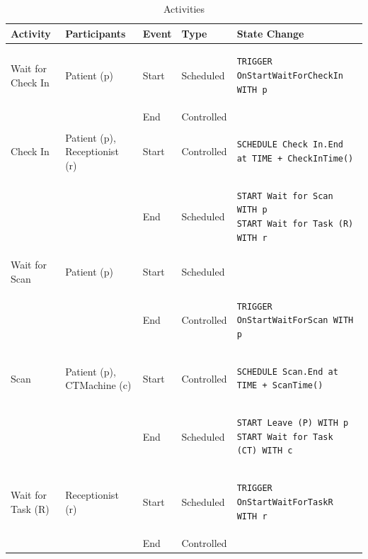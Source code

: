 \documentclass[
  10pt,
  a4paperpaper,
  DIV=11,
  numbers=noendperiod,
  oneside]{scrreprt}
\begin{document}
\begin{longtable}{@{}>{\raggedright\arraybackslash}p{1.8cm}>{\raggedright\arraybackslash}p{2.1cm}>{\raggedright\arraybackslash}p{0.9cm}>{\raggedright\arraybackslash}p{2.2cm}>{\raggedright\arraybackslash}p{8cm}@{}}

\caption{\label{tbl-activities_lab1}Activities}

\tabularnewline

  \toprule
  Activity          & Participants & Event & Type       & State Change \\ \midrule
  \endhead
  Wait for Check In & Patient (p)  & Start & Scheduled  & 
  \begin{lstlisting}[language=CMPseudo]
TRIGGER OnStartWaitForCheckIn WITH p
  \end{lstlisting}
  \\ \cmidrule{3-5}
                    &              & End   & Controlled &
  
  \\ \midrule
  Check In & Patient (p), Receptionist (r)  & Start & Controlled  & 
  \begin{lstlisting}[language=CMPseudo]
SCHEDULE Check In.End at TIME + CheckInTime()
  \end{lstlisting}
  \\ \cmidrule{3-5}
                    &              & End   & Scheduled &
  \begin{lstlisting}[language=CMPseudo]
START Wait for Scan WITH p
START Wait for Task (R) WITH r
  \end{lstlisting}          
  \\ \midrule
  Wait for Scan & Patient (p)  & Start & Scheduled  &              \\ \cmidrule{3-5}
                &              & End   & Controlled &
  \begin{lstlisting}[language=CMPseudo]
TRIGGER OnStartWaitForScan WITH p
  \end{lstlisting}
  \\ \midrule
  Scan & Patient (p), CTMachine (c)  & Start & Controlled  & 
  \begin{lstlisting}[language=CMPseudo]
SCHEDULE Scan.End at TIME + ScanTime()
  \end{lstlisting}
  \\ \cmidrule{3-5}
                    &              & End   & Scheduled &
  \begin{lstlisting}[language=CMPseudo]
START Leave (P) WITH p
START Wait for Task (CT) WITH c
  \end{lstlisting}          
  \\ \midrule
  Wait for Task (R) & Receptionist (r)  & Start & Scheduled  &
  \begin{lstlisting}[language=CMPseudo]
TRIGGER OnStartWaitForTaskR WITH r
  \end{lstlisting}
  \\ \cmidrule{3-5}
                    &              & End   & Controlled &
  

\end{longtable}
\end{document}
